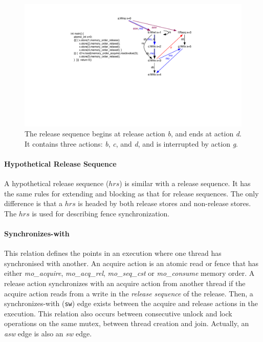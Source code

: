\documentclass[preprint, numbers, 10pt]{sigplanconf}
\begin{document}
\begin{figure}%
\centering\includegraphics[scale=0.45]{rs_Relation.pdf} %
\caption{The release sequence begins at release action \textit{b}, and
ends at action \textit{d}. It contains three actions: 
\textit{b}, \textit{c}, and \textit{d}, and is interrupted by action \textit{g}.}
\label{fig:rs_relation}
\end{figure}

\paragraph{Hypothetical Release Sequence}

A hypothetical release sequence ($hrs$) is similar with a release sequence.
It has the same rules for extending and blocking as that for release sequences. 
The only difference is that a $hrs$ is headed by both release stores and non-release stores. 
The $hrs$ is used for describing fence synchronization.

\paragraph{Synchronizes-with}

This relation defines the points in an execution where
one thread has synchronised with another. 
An acquire action is an atomic read or fence that has 
either \textit{mo\_acquire}, \textit{mo\_acq\_rel}, \textit{mo\_seq\_cst} 
or \textit{mo\_consume} memory order. A release action synchronizes 
with an acquire action from another thread if the acquire action 
reads from a write in the \textit{release sequence} of the release. Then, 
a synchronizes-with (\texttt{sw}) edge exists between the acquire and 
release actions in the execution. 
This relation also occurs between consecutive unlock and lock 
operations on the same mutex, between thread creation and join.
Actually, an \textit{asw} edge is also an \textit{sw} edge.
\end{document}
